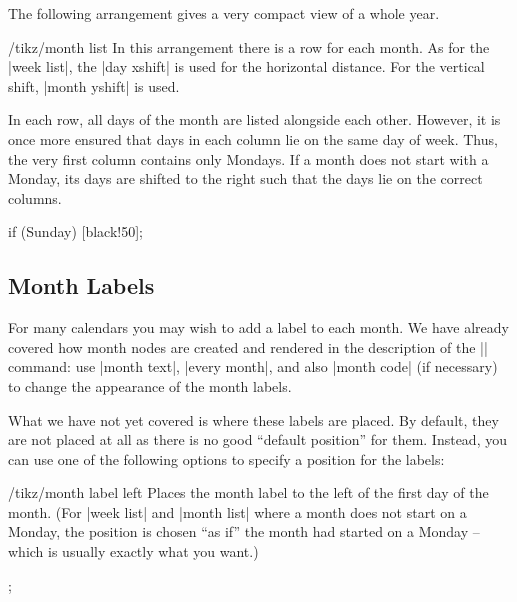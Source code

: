 The following arrangement gives a very compact view of a whole year.
%
\begin{stylekey}{/tikz/month list}
    In this arrangement there is a row for each month. As for the |week list|,
    the |day xshift| is used for the horizontal distance. For the vertical
    shift, |month yshift| is used.

    In each row, all days of the month are listed alongside each other.
    However, it is once more ensured that days in each column lie on the same
    day of week. Thus, the very first column contains only Mondays. If a month
    does not start with a Monday, its days are shifted to the right such that
    the days lie on the correct columns.
\begin{codeexample}[preamble={\usetikzlibrary{calendar}}]
\sffamily\scriptsize
\tikz
  \calendar [dates=2000-01-01 to 2000-12-31,
             month list,month label left,month yshift=1.25em]
            if (Sunday) [black!50];
\end{codeexample}
\end{stylekey}


\subsection{Month Labels}

For many calendars you may wish to add a label to each month. We have already
covered how month nodes are created and rendered in the description of the
|\calendar| command: use |month text|, |every month|, and also |month code| (if
necessary) to change the appearance of the month labels.

What we have not yet covered is where these labels are placed. By default, they
are not placed at all as there is no good ``default position'' for them.
Instead, you can use one of the following options to specify a position for the
labels:
%
\begin{stylekey}{/tikz/month label left}
    Places the month label to the left of the first day of the month. (For
    |week list| and |month list| where a month does not start on a Monday, the
    position is chosen ``as if'' the month had started on a Monday --  which is
    usually exactly what you want.)
\begin{codeexample}[preamble={\usetikzlibrary{calendar}}]
\tikz
  \calendar [dates=2000-01-28 to 2000-02-03,
             day list downward,month yshift=1em,
             month label left];
\end{codeexample}
\end{stylekey}

